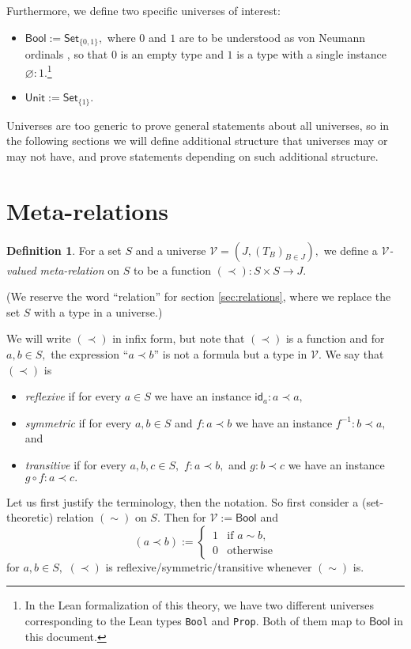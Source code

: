 \documentclass[a4paper]{article}
\theoremstyle{definition}
\newtheorem{definition}{Definition}[section]
\theoremstyle{remark}
\newcommand{\defn}{\emph}
\renewcommand{\emptyset}{\varnothing}
\newcommand{\V}{\mathcal{V}}
\newcommand{\nm}{\mathsf}
\newcommand{\universe}{\nm}
\newcommand{\Unit}{\universe{Unit}}
\newcommand{\Bool}{\universe{Bool}}
\newcommand{\Set}{\universe{Set}}
\newcommand{\id}{\nm{id}}
\newcommand{\Lean}{\texttt}
\begin{document}
Furthermore, we define two specific universes of interest:
\begin{itemize}
  \item $\Bool := \Set_{\{0, 1\}},$ where $0$ and $1$ are to be understood as von Neumann ordinals
  \cite{von-neumann-ordinals}, so that $0$ is an empty type and $1$ is a type with a single
  instance $\emptyset : 1.$\footnote{In the Lean formalization of this theory, we have two different universes
  corresponding to the Lean types \Lean{Bool} and \Lean{Prop}. Both of them map to $\Bool$ in this document.}
  \item $\Unit := \Set_{\{1\}}.$
\end{itemize}

Universes are too generic to prove general statements about all universes, so in the following sections
we will define additional structure that universes may or may not have, and prove statements depending
on such additional structure.

\section{Meta-relations}
\label{sec:meta-relations}

\begin{definition}
  For a set $S$ and a universe $\V = (J, (T_B)_{B \in J}),$ we define a \defn{$\V$-valued meta-relation}
  on $S$ to be a function $(\prec) : S \times S \to J.$
\end{definition}

(We reserve the word ``relation'' for section \ref{sec:relations}, where we replace the set $S$ with a type
in a universe.)

We will write $(\prec)$ in infix form, but note that $(\prec)$ is a function and for $a,b \in S,$ the
expression ``$a \prec b$'' is not a formula but a type in $\V.$
We say that $(\prec)$ is
\begin{itemize}
  \item \defn{reflexive} if for every $a \in S$ we have an instance $\id_a : a \prec a,$
  \item \defn{symmetric} if for every $a,b \in S$ and $f : a \prec b$ we have an instance
  $f^{-1} : b \prec a,$ and
  \item \defn{transitive} if for every $a,b,c \in S,$ $f : a \prec b,$ and $g : b \prec c$ we have an
  instance $g \circ f : a \prec c.$
\end{itemize}

Let us first justify the terminology, then the notation. So first consider a (set-theoretic) relation
$(\sim)$ on $S.$ Then for $\V := \Bool$ and
\[(a \prec b) := \begin{cases}
  \, 1 & \text{if } a \sim b,\\
  \, 0 & \text{otherwise}
\end{cases}\]
for $a,b \in S,$ $(\prec)$ is reflexive/symmetric/transitive whenever $(\sim)$ is.
\end{document}
